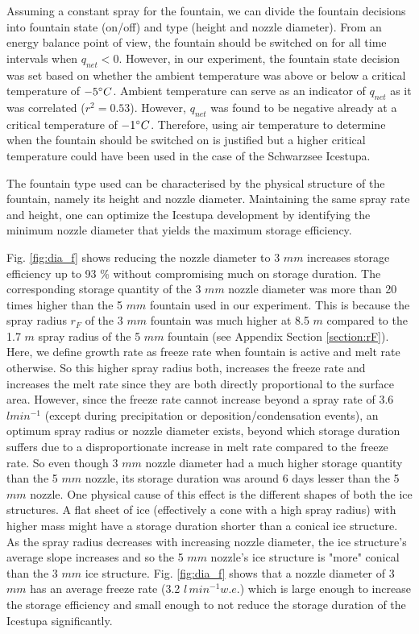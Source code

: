 \documentclass[utf8]{frontiersSCNS} %
\begin{document}
Assuming a constant spray for the fountain, we can divide the fountain
decisions into fountain state (on/off) and type (height and nozzle diameter).
From an energy balance point of view, the fountain should be switched on for
all time intervals when $q_{net} < 0$. However, in our experiment, the
fountain state decision was set based on whether the ambient temperature was
above or below a critical temperature of $-5 \degree C$. Ambient temperature
can serve as an indicator of $q_{net}$ as it was correlated ($r^2 = 0.53$).
However, $q_{net}$ was found to be negative already at a critical temperature
of $-1 \degree C$. Therefore, using air temperature to determine when the
fountain should be switched on is justified but a higher critical temperature
could have been used in the case of the Schwarzsee Icestupa. 

The fountain type used can be characterised by the physical structure of the
fountain, namely its height and nozzle diameter. Maintaining the same spray
rate and height, one can optimize the Icestupa development by identifying the
minimum nozzle diameter that yields the maximum storage efficiency. 

Fig. \ref{fig:dia_f} shows reducing the nozzle diameter to 3 $mm$ increases
storage efficiency up to 93 \% without compromising much on storage duration.
The corresponding storage quantity of the 3 $mm$ nozzle diameter was more than
20 times higher than the 5 $mm$ fountain used in our experiment. This is
because the spray radius $r_F$ of the 3 $mm$ fountain was much higher at 8.5
$m$ compared to the 1.7 $m$ spray radius of the 5 $mm$ fountain (see Appendix
Section \ref{section:rF}). Here, we define growth rate as freeze rate when
fountain is active and melt rate otherwise. So this higher spray radius both,
increases the freeze rate  and increases the melt rate since they are both
directly proportional to the surface area. However, since the freeze rate
cannot increase beyond a spray rate of 3.6 $l min^{-1}$ (except during
precipitation or deposition/condensation events), an optimum spray radius or
nozzle diameter exists, beyond which storage duration suffers due to a
disproportionate increase in melt rate compared to the freeze rate. So even
though 3 $mm$ nozzle diameter had a much higher storage quantity than the 5
$mm$ nozzle, its storage duration was around 6 days lesser than the 5 $mm$
nozzle. One physical cause of this effect is the different shapes of both the
ice structures. A flat sheet of ice (effectively a cone with a high spray
radius) with higher mass might have a storage duration shorter than a conical
ice structure. As the spray radius decreases with increasing nozzle diameter,
the ice structure’s average slope increases and so the 5 $mm$ nozzle's ice
structure is "more" conical than the 3 $mm$ ice structure. Fig.
\ref{fig:dia_f} shows that a nozzle diameter of 3 $mm$ has an average freeze
rate (3.2 $l \,min^{-1} w.e.$) which is large enough to increase the storage
efficiency and small enough to not reduce the storage duration of the Icestupa
significantly.
\end{document}
